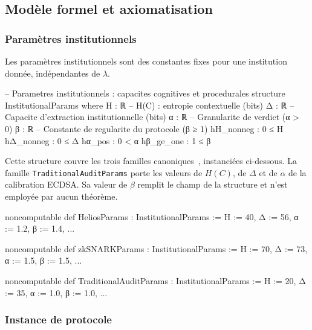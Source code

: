 \subsection{Mod\`ele formel et axiomatisation}
\label{subsec:modele_formel_lean4}
\begin{sloppypar}
\subsubsection{Param\`etres institutionnels}
\label{subsubsec:params_institutionnels_lean4}

Les param\`etres institutionnels sont des constantes fixes pour une
institution donn\'ee, ind\'ependantes de $\lambda$.

\begin{leancode}[caption={Structure InstitutionalParams des param\`etres institutionnels en Lean4}, label={lst:lean4_institutional_params}]
-- Parametres institutionnels : capacites cognitives et procedurales
structure InstitutionalParams where
  H : ℝ      -- H(C) : entropie contextuelle (bits)
  Δ : ℝ      -- Capacite d'extraction institutionnelle (bits)
  α : ℝ      -- Granularite de verdict (α > 0)
  β : ℝ      -- Constante de regularite du protocole (β ≥ 1)
  hH_nonneg : 0 ≤ H
  hΔ_nonneg : 0 ≤ Δ
  hα_pos    : 0 < α
  hβ_ge_one : 1 ≤ β
\end{leancode}

Cette structure couvre les trois familles canoniques~\cite{Adida08,Groth16,Johnson01},
instanci\'ees ci-dessous. La famille \texttt{TraditionalAuditParams} porte les valeurs de $H(C)$, de
$\Delta$ et de $\alpha$ de la calibration ECDSA. Sa valeur de $\beta$ remplit le champ de la structure
et n'est employ\'ee par aucun th\'eor\`eme.

\begin{leancode}[caption={Instances canoniques Helios, zk-SNARKs et audit traditionnel}, label={lst:lean4_instances_canoniques}]
noncomputable def HeliosParams : InstitutionalParams :=
  { H := 40, Δ := 56, α := 1.2, β := 1.4, ... }

noncomputable def zkSNARKParams : InstitutionalParams :=
  { H := 70, Δ := 73, α := 1.5, β := 1.5, ... }

noncomputable def TraditionalAuditParams : InstitutionalParams :=
  { H := 20, Δ := 35, α := 1.0, β := 1.0, ... }
\end{leancode}

\subsubsection{Instance de protocole}
\label{subsubsec:instance_protocole_lean4}


\end{sloppypar}
